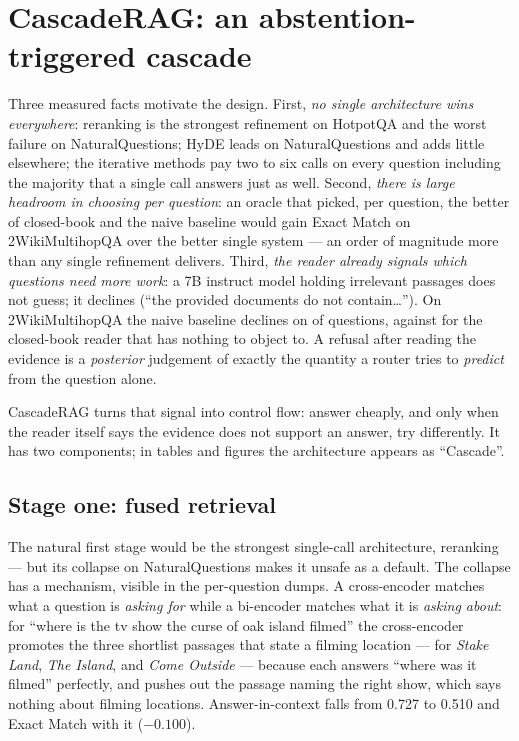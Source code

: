 \section{CascadeRAG: an abstention-triggered cascade}
\label{sec:cascade}

Three measured facts motivate the design. First, \emph{no single
architecture wins everywhere}: reranking is the strongest refinement on
HotpotQA and the worst failure on NaturalQuestions; HyDE leads on
NaturalQuestions and adds little elsewhere; the iterative methods pay two
to six calls on every question including the majority that a single call
answers just as well. Second, \emph{there is large headroom in choosing
per question}: an oracle that picked, per question, the better of
closed-book and the naive baseline would gain
\DiagTwoWikiOracleGain{} Exact Match on 2WikiMultihopQA over the better
single system --- an order of magnitude more than any single refinement
delivers. Third, \emph{the reader already signals which questions need
more work}: a 7B instruct model holding irrelevant passages does not
guess; it declines (``the provided documents do not contain\ldots'').
On 2WikiMultihopQA the naive baseline declines on
\NaiveRAGTwoWikiAbstentionRate{} of questions, against
\ClosedBookTwoWikiAbstentionRate{} for the closed-book reader that has
nothing to object to. A refusal after reading the evidence is a
\emph{posterior} judgement of exactly the quantity a router tries to
\emph{predict} from the question alone.

CascadeRAG turns that signal into control flow: answer cheaply, and only
when the reader itself says the evidence does not support an answer, try
differently. It has two components; in tables and figures the
architecture appears as ``Cascade''.

\subsection{Stage one: fused retrieval}
\label{sec:cascade-fused}

The natural first stage would be the strongest single-call architecture,
reranking --- but its collapse on NaturalQuestions makes it unsafe as a
default. The collapse has a mechanism, visible in the per-question dumps.
A cross-encoder matches what a question is \emph{asking for} while a
bi-encoder matches what it is \emph{asking about}: for ``where is the tv
show the curse of oak island filmed'' the cross-encoder promotes the three
shortlist passages that state a filming location --- for \emph{Stake
Land}, \emph{The Island}, and \emph{Come Outside} --- because each answers
``where was it filmed'' perfectly, and pushes out the passage naming the
right show, which says nothing about filming locations. Answer-in-context
falls from 0.727 to 0.510 and Exact Match with it
($-0.100$).

